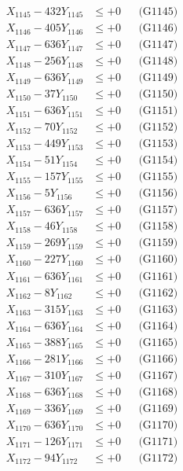\documentclass[a4paper,10pt]{article}
\begin{document}
{\begin{align}
X_{1145} - 432Y_{1145} &\leq +0 && \text{(G1145)} \\
X_{1146} - 405Y_{1146} &\leq +0 && \text{(G1146)} \\
X_{1147} - 636Y_{1147} &\leq +0 && \text{(G1147)} \\
X_{1148} - 256Y_{1148} &\leq +0 && \text{(G1148)} \\
X_{1149} - 636Y_{1149} &\leq +0 && \text{(G1149)} \\
X_{1150} - 37Y_{1150} &\leq +0 && \text{(G1150)} \\
\allowbreak
X_{1151} - 636Y_{1151} &\leq +0 && \text{(G1151)} \\
X_{1152} - 70Y_{1152} &\leq +0 && \text{(G1152)} \\
X_{1153} - 449Y_{1153} &\leq +0 && \text{(G1153)} \\
X_{1154} - 51Y_{1154} &\leq +0 && \text{(G1154)} \\
X_{1155} - 157Y_{1155} &\leq +0 && \text{(G1155)} \\
X_{1156} - 5Y_{1156} &\leq +0 && \text{(G1156)} \\
X_{1157} - 636Y_{1157} &\leq +0 && \text{(G1157)} \\
X_{1158} - 46Y_{1158} &\leq +0 && \text{(G1158)} \\
X_{1159} - 269Y_{1159} &\leq +0 && \text{(G1159)} \\
X_{1160} - 227Y_{1160} &\leq +0 && \text{(G1160)} \\
\allowbreak
X_{1161} - 636Y_{1161} &\leq +0 && \text{(G1161)} \\
X_{1162} - 8Y_{1162} &\leq +0 && \text{(G1162)} \\
X_{1163} - 315Y_{1163} &\leq +0 && \text{(G1163)} \\
X_{1164} - 636Y_{1164} &\leq +0 && \text{(G1164)} \\
X_{1165} - 388Y_{1165} &\leq +0 && \text{(G1165)} \\
X_{1166} - 281Y_{1166} &\leq +0 && \text{(G1166)} \\
X_{1167} - 310Y_{1167} &\leq +0 && \text{(G1167)} \\
X_{1168} - 636Y_{1168} &\leq +0 && \text{(G1168)} \\
X_{1169} - 336Y_{1169} &\leq +0 && \text{(G1169)} \\
X_{1170} - 636Y_{1170} &\leq +0 && \text{(G1170)} \\
\allowbreak
X_{1171} - 126Y_{1171} &\leq +0 && \text{(G1171)} \\
X_{1172} - 94Y_{1172} &\leq +0 && \text{(G1172)} \\

\end{align}}
\end{document}
